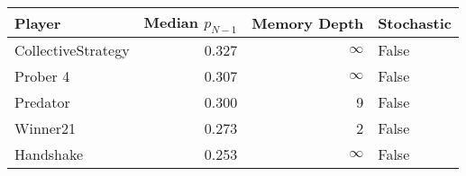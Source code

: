 \begin{tabular}{lrrl}
\toprule
             Player &  Median $p_{N-1}$ &  Memory Depth & Stochastic \\
\midrule
 CollectiveStrategy &             0.327 &            \(\infty\) &      False \\
           Prober 4 &             0.307 &            \(\infty\) &      False \\
           Predator &             0.300 &             9 &      False \\
           Winner21 &             0.273 &             2 &      False \\
          Handshake &             0.253 &            \(\infty\) &      False \\
\bottomrule
\end{tabular}
